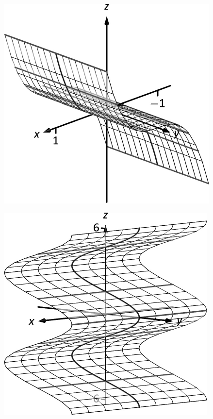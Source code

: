 \documentclass[10pt]{article}
\begin{document}
\includegraphics{fig10_01_ex_15_3DBW.pdf}
\texttt{}

\includegraphics{fig10_01_ex_16_3DBW.pdf}
\texttt{}
\end{document}
